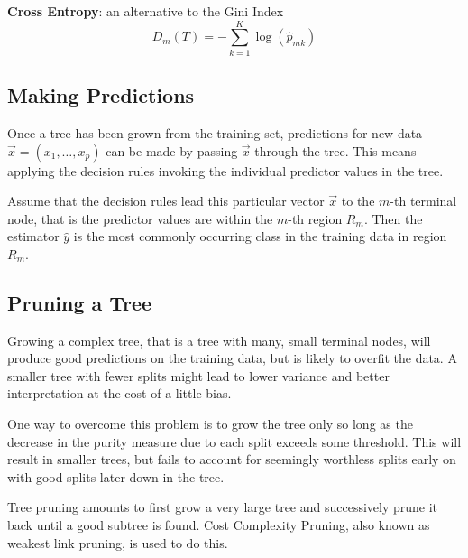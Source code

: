 \documentclass[11pt]{article}
\begin{document}
\vspace{1em}
\noindent
\textbf{Cross Entropy}: an alternative to the Gini Index
\begin{equation*}
	D_m(T) = -\sum_{k=1}^{K} \log(\hat{p}_{mk})
\end{equation*}

\subsection{Making Predictions}
Once a tree has been grown from the training set, predictions for new data $\vec{x} = (x_1, \dots, x_p)$ can be made by passing $\vec{x}$ through the tree. This means applying the decision rules invoking the individual predictor values in the tree.

Assume that the decision rules lead this particular vector $\vec{x}$ to the $m$-th terminal node, that is the predictor values are within the $m$-th region $R_m$. Then the estimator $\hat{y}$ is the most commonly occurring class in the training data in region $R_m$.

\subsection{Pruning a Tree}
Growing a complex tree, that is a tree with many, small terminal nodes, will produce good predictions on the training data, but is likely to overfit the data. A smaller tree with fewer splits might lead to lower variance and better interpretation at the cost of a little bias.

One way to overcome this problem is to grow the tree only so long as the decrease in the purity measure due to each split exceeds some threshold. This will result in smaller trees, but fails to account for seemingly worthless splits early on with good splits later down in the tree.

Tree pruning amounts to first grow a very large tree and successively prune it back until a good subtree is found. Cost Complexity Pruning, also known as weakest link pruning, is used to do this.
\end{document}
